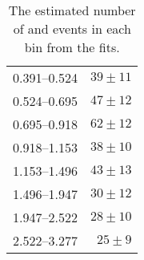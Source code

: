 \begin{table}[p]
\begin{center}
\begin{tabular}{@{}l r@{}}
            0.391--0.524  &  $39   \pm  11$  \\
            0.524--0.695  &  $47   \pm  12$  \\
            0.695--0.918  &  $62   \pm  12$  \\
            0.918--1.153  &  $38   \pm  10$  \\
            1.153--1.496  &  $43   \pm  13$  \\
            1.496--1.947  &  $30   \pm  12$  \\
            1.947--2.522  &  $28   \pm  10$  \\
            2.522--3.277  &  $25   \pm  9$   \\
            \bottomrule
        \end{tabular}
    \end{center}
    \caption{
        The estimated number of \QCDjets and \wjets events in each \phistar bin
        from the fits.
    }
    \label{table:qcd_fits}
\end{table}
